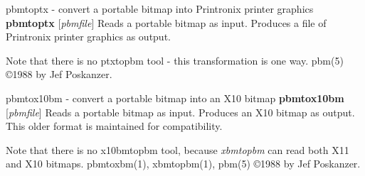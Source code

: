 pbmtoptx - convert a portable bitmap into Printronix printer graphics
{\bf pbmtoptx}
{\rm [}{\it pbmfile}{\rm ]}
Reads a portable bitmap as input.
Produces a file of Printronix printer graphics as output.
\par
Note that there is no ptxtopbm tool - this transformation is one way.
pbm(5)
\copyright 1988 by Jef Poskanzer.
%
 
%

\newpage
%

pbmtox10bm - convert a portable bitmap into an X10 bitmap
{\bf pbmtox10bm}
{\rm [}{\it pbmfile}{\rm ]}
Reads a portable bitmap as input.
Produces an X10 bitmap as output.
This older format is maintained for compatibility.
\par
Note that there is no x10bmtopbm tool, because
{\it xbmtopbm}
can read both X11 and X10 bitmaps.
pbmtoxbm(1), xbmtopbm(1), pbm(5)
\copyright 1988 by Jef Poskanzer.
%
 
